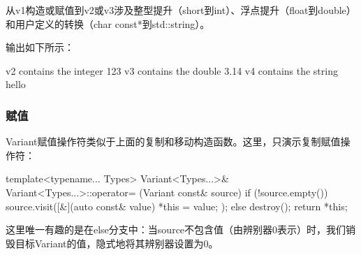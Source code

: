 从v1构造或赋值到v2或v3涉及整型提升（short到int）、浮点提升（float到double）和用户定义的转换（char const*到std::string）。

输出如下所示：

\begin{shell}
v2 contains the integer 123
v3 contains the double 3.14
v4 contains the string hello
\end{shell}

\subsubsection{赋值}

Variant赋值操作符类似于上面的复制和移动构造函数。这里，只演示复制赋值操作符：

\begin{cpp}
template<typename... Types>
Variant<Types...>& Variant<Types...>::operator= (Variant const& source) {
	if (!source.empty()) {
		source.visit([&](auto const& value) {
			*this = value;
		});
	}
	else {
		destroy();
	}
	return *this;
}
\end{cpp}

这里唯一有趣的是在else分支中：当source不包含值（由辨别器0表示）时，我们销毁目标Variant的值，隐式地将其辨别器设置为0。


















